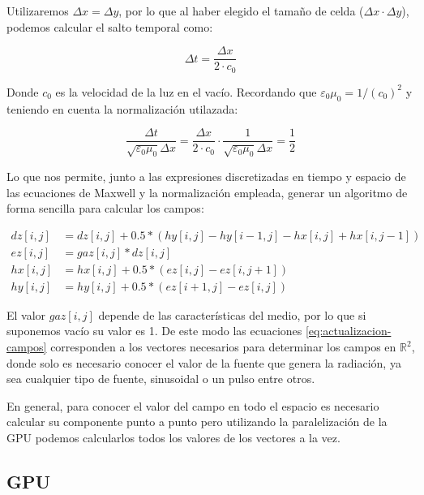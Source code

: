 \documentclass[11pt,a4paper,twoside,pdf]{article}
\numberwithin{equation}{section}
\begin{document}
Utilizaremos $\Delta x = \Delta y$, por lo que al haber elegido el tamaño de celda ($\Delta x \cdot \Delta y$), podemos calcular el salto temporal como:

\begin{equation}
\Delta t=\frac{\Delta x}{2 \cdot c_{0}}
\end{equation}

Donde $c_{0}$ es la velocidad de la luz en el vacío. Recordando que $\varepsilon_{0} \mu_{0}=1/(c_{0})^2$ y teniendo en cuenta la normalización utilazada:

\begin{equation}
    \frac{\Delta t}{\sqrt{\varepsilon_{0} \mu_{0}} \Delta x}=\frac{\Delta x}{2 \cdot c_{0}}\cdot 
     \frac{1}{\sqrt{\varepsilon_{0} \mu_{0}} \Delta x}=\frac{1}{2}
\end{equation}

Lo que nos permite, junto a las expresiones discretizadas en tiempo y espacio de las ecuaciones de Maxwell y la normalización empleada, generar un algoritmo de forma sencilla para calcular los campos:

\begin{align} \label{eq:actualizacion-campos}
	dz[i,j] &=dz[i,j] + 0.5*(hy[i,j]-hy[i-1,j]-hx[i,j]+hx[i,j-1]) \nonumber \\
    ez[i,j] &=gaz[i,j]*dz[i,j]  \nonumber \\
    hx[i,j] &=hx[i,j]+0.5*(ez[i,j]-ez[i,j+1]) \nonumber \\
    hy[i,j] &=hy[i,j]+0.5*(ez[i+1,j]-ez[i,j]) 
\end{align}

El valor $gaz[i,j]$ depende de las características del medio, por lo que si suponemos vacío su valor es 1. De este modo las ecuaciones \eqref{eq:actualizacion-campos} corresponden a los vectores necesarios para determinar los campos en $\mathbb R^{2}$, donde solo es necesario conocer el valor de la fuente que genera la radiación, ya sea cualquier tipo de fuente, sinusoidal o un pulso entre otros. 

En general, para conocer el valor del campo en todo el espacio es necesario calcular  su componente punto a punto pero utilizando la paralelización de la GPU podemos calcularlos todos los valores de los vectores a la vez.

\subsection{GPU} \label{subsection:GPU}
\end{document}
